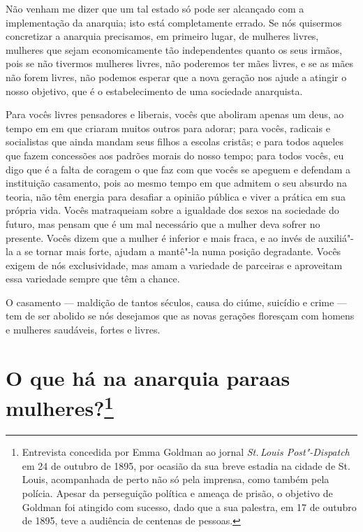 Não venham me dizer que um tal estado só pode ser alcançado com a
implementação da anarquia; isto está completamente errado. Se nós
quisermos concretizar a anarquia precisamos, em primeiro lugar, de mulheres livres, mulheres que sejam economicamente tão
independentes quanto os seus irmãos, pois se não tivermos mulheres
livres, não poderemos ter mães livres, e se as mães não forem livres,
não podemos esperar que a nova geração nos ajude a atingir o nosso
objetivo, que é o estabelecimento de uma sociedade anarquista.

Para vocês livres pensadores e liberais, vocês que aboliram apenas um deus, ao tempo em em que criaram muitos outros para adorar; para vocês, radicais e
socialistas que ainda mandam seus filhos a escolas cristãs; e para
todos aqueles que fazem concessões aos padrões morais do nosso tempo;
para todos vocês, eu digo que é a falta de coragem o que faz com que
vocês se apeguem e defendam a instituição casamento, pois ao mesmo tempo
em que admitem o seu absurdo na teoria, não têm energia para
desafiar a opinião pública e viver a prática em sua própria vida. Vocês
matraqueiam sobre a igualdade dos sexos na sociedade do futuro, mas
pensam que é um mal necessário que a mulher deva sofrer no presente.
Vocês dizem que a mulher é inferior e mais fraca, e ao invés de
auxiliá"-la a se tornar mais forte, ajudam a mantê"-la numa posição
degradante. Vocês exigem de nós exclusividade, mas amam a variedade de
parceiras e aproveitam essa variedade sempre que têm a chance.

O casamento --- maldição de tantos séculos, causa do ciúme, suicídio e
crime --- tem de ser abolido se nós desejamos que as novas gerações
floresçam com homens e mulheres saudáveis, fortes e livres.

\chapter[O que há na anarquia para as mulheres?]{O que há na anarquia para\break as mulheres?\footnote{Entrevista concedida por Emma Goldman
  ao jornal \emph{St.\,Louis Post"-Dispatch} em 24 de outubro de 1895, por
  ocasião da sua breve estadia na cidade de St.\,Louis, acompanhada de
  perto não só pela imprensa, como também pela polícia. Apesar da
  perseguição política e ameaça de prisão, o objetivo de Goldman foi
  atingido com sucesso, dado que a sua palestra, em 17 de outubro de
  1895, teve a audiência de centenas de pessoas.}}

\setlength{\epigraphwidth}{.65\textwidth}
\begin{epigraphs} 
\end{epigraphs} 

